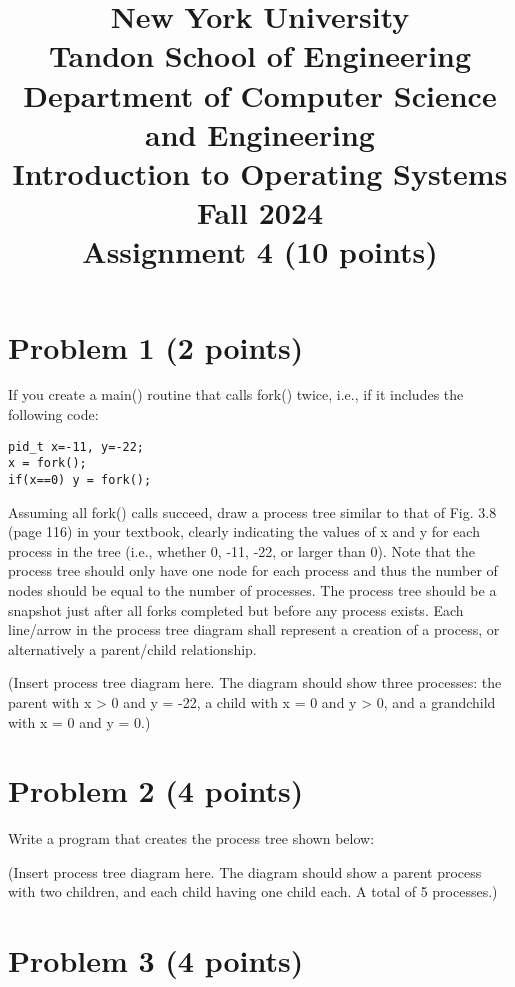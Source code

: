 \documentclass{article}
\begin{document}
\title{New York University \\ Tandon School of Engineering \\ Department of Computer Science and Engineering \\ Introduction to Operating Systems \\ Fall 2024 \\ Assignment 4 (10 points)}
\date{}
\maketitle

\section*{Problem 1 (2 points)}

If you create a main() routine that calls fork() twice, i.e., if it includes the following code:

\begin{verbatim}
pid_t x=-11, y=-22;
x = fork();
if(x==0) y = fork();
\end{verbatim}

Assuming all fork() calls succeed, draw a process tree similar to that of Fig. 3.8 (page 116) in your textbook, clearly indicating the values of x and y for each process in the tree (i.e., whether 0, -11, -22, or larger than 0). Note that the process tree should only have one node for each process and thus the number of nodes should be equal to the number of processes. The process tree should be a snapshot just after all forks completed but before any process exists. Each line/arrow in the process tree diagram shall represent a creation of a process, or alternatively a parent/child relationship.

(Insert process tree diagram here.  The diagram should show three processes: the parent with x > 0 and y = -22, a child with x = 0 and y > 0, and a grandchild with x = 0 and y = 0.)


\section*{Problem 2 (4 points)}

Write a program that creates the process tree shown below:

(Insert process tree diagram here. The diagram should show a parent process with two children, and each child having one child each.  A total of 5 processes.)


\section*{Problem 3 (4 points)}
\end{document}
